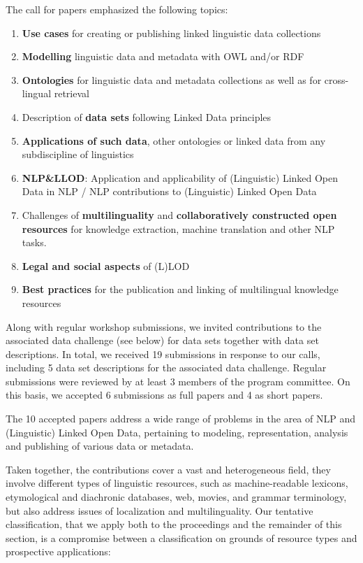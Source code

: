 The call for papers emphasized the following topics:

\begin{enumerate}
\item \textbf{Use cases} %
for creating or publishing linked linguistic data collections
\item \textbf{Modelling} linguistic data and metadata with OWL and/or RDF
\item \textbf{Ontologies} for linguistic data and metadata collections as well as for cross-lingual retrieval
\item Description of \textbf{data sets} following Linked Data principles
\item \textbf{Applications of such data}, other ontologies or linked data from any subdiscipline of linguistics %
\item \textbf{NLP\&LLOD}: Application and applicability of (Linguistic) Linked Open Data in NLP / NLP contributions to (Linguistic) Linked Open Data
\item Challenges of \textbf{multilinguality} and \textbf{collaboratively constructed open resources} %
for knowledge extraction, machine translation and other NLP tasks.
\item \textbf{Legal and social aspects} of (L)LOD
\item \textbf{Best practices} for the publication and linking of multilingual knowledge resources
\end{enumerate}

\noindent 
Along with regular workshop submissions, we invited contributions to the associated data challenge (see below) for data sets together with data set descriptions.
In total, we received 19 submissions in response to our calls, including 5 data set descriptions for the associated data challenge. Regular submissions were reviewed by at least 3 
members of the program committee. 
On this basis, we accepted 6 submissions as full papers and 4 as short papers.

The 10 accepted papers address a wide range of problems in the area of NLP and (Linguistic) Linked Open Data, pertaining to modeling, representation, analysis and publishing of various 
data or metadata.

Taken together, the contributions cover a vast and heterogeneous field, they involve different types of linguistic resources, such as machine-readable lexicons, etymological and diachronic databases, web, movies, and grammar terminology, but also address issues of localization and multilinguality. Our tentative classification, that we apply both to the proceedings and the remainder of this section, is a compromise between a classification on grounds of resource types and prospective applications:

